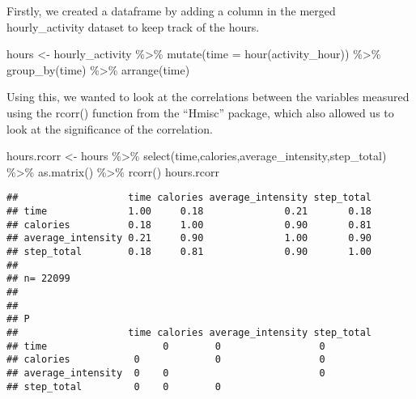 \documentclass[
]{article}
\newenvironment{Shaded}{\begin{snugshade}}{\end{snugshade}}
\newcommand{\AttributeTok}[1]{\textcolor[rgb]{0.77,0.63,0.00}{#1}}
\newcommand{\DecValTok}[1]{\textcolor[rgb]{0.00,0.00,0.81}{#1}}
\newcommand{\FunctionTok}[1]{\textcolor[rgb]{0.00,0.00,0.00}{#1}}
\newcommand{\NormalTok}[1]{#1}
\newcommand{\OtherTok}[1]{\textcolor[rgb]{0.56,0.35,0.01}{#1}}
\newcommand{\SpecialCharTok}[1]{\textcolor[rgb]{0.00,0.00,0.00}{#1}}
\begin{document}
Firstly, we created a dataframe by adding a column in the merged
hourly\_activity dataset to keep track of the hours.

\begin{Shaded}
\begin{Highlighting}[]
\NormalTok{hours }\OtherTok{\textless{}{-}}\NormalTok{ hourly\_activity }\SpecialCharTok{\%\textgreater{}\%}
  \FunctionTok{mutate}\NormalTok{(}\AttributeTok{time =} \FunctionTok{hour}\NormalTok{(activity\_hour)) }\SpecialCharTok{\%\textgreater{}\%}
  \FunctionTok{group\_by}\NormalTok{(time) }\SpecialCharTok{\%\textgreater{}\%}
  \FunctionTok{arrange}\NormalTok{(time)}
\end{Highlighting}
\end{Shaded}

Using this, we wanted to look at the correlations between the variables
measured using the rcorr() function from the ``Hmisc'' package, which
also allowed us to look at the significance of the correlation.

\begin{Shaded}
\begin{Highlighting}[]
\NormalTok{hours.rcorr }\OtherTok{\textless{}{-}}\NormalTok{ hours }\SpecialCharTok{\%\textgreater{}\%}
  \FunctionTok{select}\NormalTok{(time,calories,average\_intensity,step\_total) }\SpecialCharTok{\%\textgreater{}\%}
  \FunctionTok{as.matrix}\NormalTok{() }\SpecialCharTok{\%\textgreater{}\%}
  \FunctionTok{rcorr}\NormalTok{()}
\NormalTok{hours.rcorr}
\end{Highlighting}
\end{Shaded}

\begin{verbatim}
##                   time calories average_intensity step_total
## time              1.00     0.18              0.21       0.18
## calories          0.18     1.00              0.90       0.81
## average_intensity 0.21     0.90              1.00       0.90
## step_total        0.18     0.81              0.90       1.00
## 
## n= 22099 
## 
## 
## P
##                   time calories average_intensity step_total
## time                    0        0                 0        
## calories           0             0                 0        
## average_intensity  0    0                          0        
## step_total         0    0        0
\end{verbatim}

\begin{Shaded}
\end{Shaded}
\end{document}
